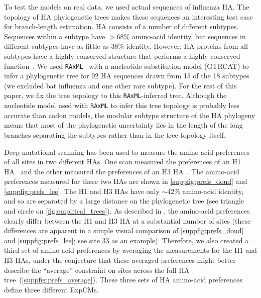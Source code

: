 \documentclass[11pt]{article}
\begin{document}
To test the models on real data, we used actual sequences of influenza HA. 
The topology of HA phylogenetic trees makes these sequences an interesting test case for branch-length estimation.
HA consists of a number of different subtypes.
Sequences within a subtype have $>$68\% amino-acid identity, but sequences in different subtypes have as little as 38\% identity.
However, HA proteins from all subtypes have a highly conserved structure that performs a highly conserved function~\citep{ha2002h5,russell2004h1}.
We used \texttt{RAxML}~\citep{stamatakis2006raxml} with a nucleotide substitution model  (GTRCAT) to infer a phylogenetic tree for 92 HA sequences drawn from 15 of the 18 subtypes (we excluded bat influenza and one other rare subtype).
For the rest of this paper, we fix the tree topology to this \texttt{RAxML}-inferred tree.
Although the nucleotide model used with \texttt{RAxML} to infer this tree topology is probably less accurate than codon models, the modular subtype structure of the HA phylogeny means that most of the phylogenetic uncertainty lies in the length of the long branches separating the subtypes rather than in the tree topology itself.

Deep mutational scanning has been used to measure the amino-acid preferences of all sites in two different HAs.
One scan measured the preferences of an H1 HA~\citep{doud2016accurate} and the other measured the preferences of an H3 HA~\citep{lee2018deep}.
The amino-acid preferences measured for these two HAs are shown in \ref{suppfig:prefs_doud} and 
\ref{suppfig:prefs_lee}.
The H1 and H3 HAs have only $\sim$42\% amino-acid identity, and so are separated by a large distance on the phylogenetic tree (see triangle and circle on \ref{fig:empirical_trees}).
As described in \citet{lee2018deep}, the amino-acid preferences clearly differ between the H1 and H3 HA at a substantial number of sites (these differences are apparent in a simple visual comparison of \ref{suppfig:prefs_doud} and 
\ref{suppfig:prefs_lee}; see site 33 as an example).
Therefore, we also created a third set of amino-acid preferences by averaging the measurements for the H1 and H3 HAs, under the conjecture that these averaged preferences might better describe the ``average'' constraint on sites across the full HA tree~(\ref{suppfig:prefs_average}).
These three sets of HA amino-acid preferences define three different ExpCMs.
  
\end{document}

